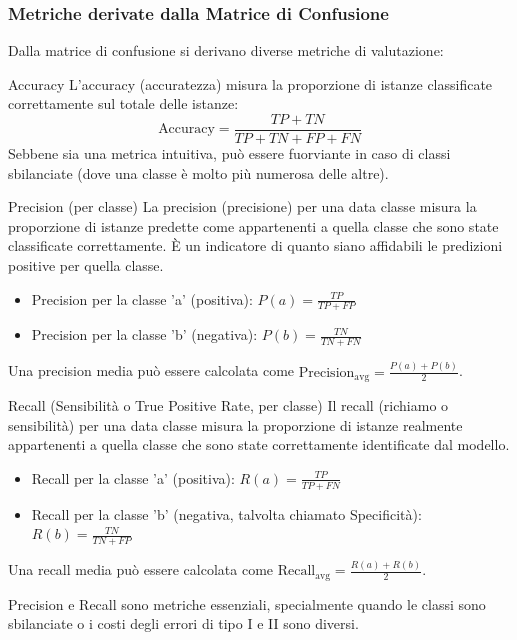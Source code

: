 \documentclass{article}
\begin{document}
\subsubsection{Metriche derivate dalla Matrice di Confusione}
Dalla matrice di confusione si derivano diverse metriche di valutazione:

\begin{definitionbox}{Accuracy}
    L'accuracy (accuratezza) misura la proporzione di istanze classificate correttamente sul totale delle istanze:
    $$ \text{Accuracy} = \frac{TP + TN}{TP + TN + FP + FN} $$
    Sebbene sia una metrica intuitiva, può essere fuorviante in caso di classi sbilanciate (dove una classe è molto più numerosa delle altre).
\end{definitionbox}

\begin{definitionbox}{Precision (per classe)}
    La precision (precisione) per una data classe misura la proporzione di istanze predette come appartenenti a quella classe che sono state classificate correttamente. È un indicatore di quanto siano affidabili le predizioni positive per quella classe.
    \begin{itemize}
        \item Precision per la classe 'a' (positiva): $ P(a) = \frac{TP}{TP + FP} $
        \item Precision per la classe 'b' (negativa): $ P(b) = \frac{TN}{TN + FN} $
    \end{itemize}
    Una precision media può essere calcolata come $ \text{Precision}_{\text{avg}} = \frac{P(a) + P(b)}{2} $.
\end{definitionbox}

\begin{definitionbox}{Recall (Sensibilità o True Positive Rate, per classe)}
    Il recall (richiamo o sensibilità) per una data classe misura la proporzione di istanze realmente appartenenti a quella classe che sono state correttamente identificate dal modello.
    \begin{itemize}
        \item Recall per la classe 'a' (positiva): $ R(a) = \frac{TP}{TP + FN} $
        \item Recall per la classe 'b' (negativa, talvolta chiamato Specificità): $ R(b) = \frac{TN}{TN + FP} $
    \end{itemize}
    Una recall media può essere calcolata come $ \text{Recall}_{\text{avg}} = \frac{R(a) + R(b)}{2} $.
\end{definitionbox}
Precision e Recall sono metriche essenziali, specialmente quando le classi sono sbilanciate o i costi degli errori di tipo I e II sono diversi.
\end{document}
